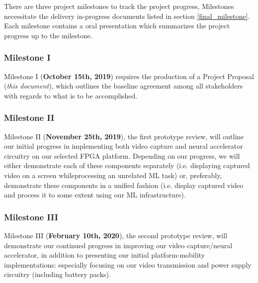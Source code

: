 There are three project milestones to track the project progress,
Milestones necessitate the delivery in-progress documents listed
in section \ref{final_milestone}. Each milestone contains a oral
presentation which summarizes the project progress up to the milestone.

\subsubsection{Milestone I}
Milestone I (\textbf{October 15th, 2019}) requires the production of a
Project Proposal (\textit{this document}), which outlines the baseline
agreement among all stakeholders with regards to what is to be accomplished. 

\subsubsection{Milestone II}
Milestone II (\textbf{November 25th, 2019}), the first prototype review,
will outline our initial progress in implementing both video capture and
neural accelerator circuitry on our selected FPGA platform. Depending on
our progress, we will either demonstrate each of these components separately
(i.e. displaying captured video on a screen whileprocessing an unrelated
ML task) or, preferably, demonstrate these components in a unified fashion
(i.e. display captured video and process it to some extent using our ML
infrastructure). 

\subsubsection{Milestone III}
Milestone III (\textbf{February 10th, 2020}), the second prototype review,
will demonstrate our continued progress in improving our video capture/neural
accelerator, in addition to presenting our initial platform-mobility
implementations: especially focusing on our video transmission and power
supply circuitry (including battery packs). 